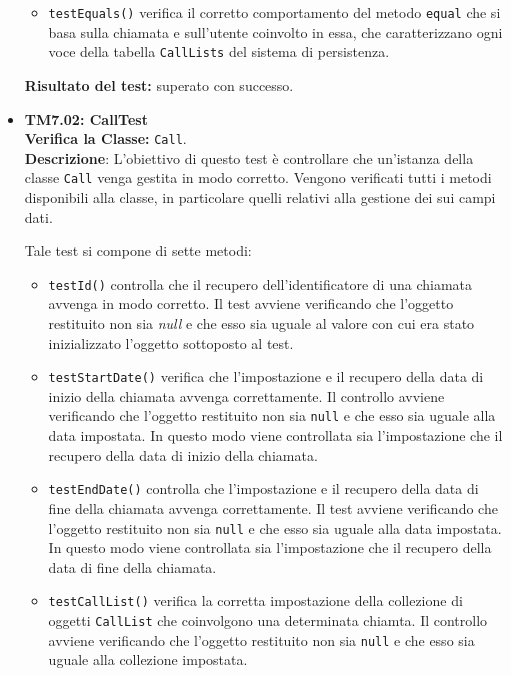 \begin{itemize}
\begin{itemize}
\item \texttt{testEquals()} verifica il corretto comportamento del metodo \texttt{equal} che si basa sulla chiamata e sull'utente coinvolto in essa, che caratterizzano ogni voce della tabella \texttt{CallLists} del sistema di persistenza. 

 
\end{itemize}
\textbf{Risultato del test:} superato con successo.

\item[\passed] \textbf{TM7.02: CallTest}\\
\textbf{Verifica la Classe:} \texttt{Call}.\\
\textbf{Descrizione}: L'obiettivo di questo test è controllare che un'istanza della classe  \texttt{Call} venga gestita in modo corretto. Vengono verificati tutti i metodi disponibili alla classe, in particolare quelli relativi alla gestione dei sui campi dati.

Tale test si compone di sette metodi:
\begin{itemize}

\item \texttt{testId()} controlla che il recupero dell'identificatore di una chiamata avvenga in modo corretto. 
Il test avviene verificando che l'oggetto restituito non sia \textit{null} e che esso sia uguale al valore con cui era stato inizializzato l'oggetto sottoposto al test.

\item \texttt{testStartDate()} verifica che l'impostazione e il recupero della data di inizio della chiamata avvenga correttamente.
Il controllo avviene verificando che l'oggetto restituito non sia \texttt{null} e che esso sia uguale alla data impostata. In questo modo viene controllata sia l'impostazione che il recupero della data di inizio della chiamata.

\item \texttt{testEndDate()} controlla che l'impostazione e il recupero della data di fine della chiamata avvenga correttamente.
Il test avviene verificando che l'oggetto restituito non sia \texttt{null} e che esso sia uguale alla data impostata. In questo modo viene controllata sia l'impostazione che il recupero della data di fine della chiamata.

\item \texttt{testCallList()} verifica la corretta impostazione  della collezione di oggetti \texttt{CallList} che coinvolgono una determinata chiamta. 
Il controllo avviene verificando che l'oggetto restituito non sia \texttt{null} e che esso sia uguale alla collezione impostata.


\end{itemize}
\end{itemize}
